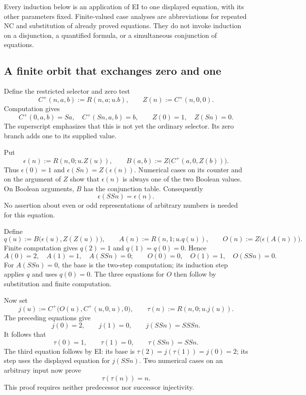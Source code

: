 Every induction below is an application of EI to one displayed
equation, with its other parameters fixed.  Finite-valued case analyses
are abbreviations for repeated NC and substitution of already proved
equations.  They do not invoke induction on a disjunction, a quantified
formula, or a simultaneous conjunction of equations.

\subsection{A finite orbit that exchanges zero and one}

Define the restricted selector and zero test
\[
 C^+(n,a,b):=R(n,a;u.b),\qquad Z(n):=C^+(n,0,0).
\]
Computation gives
\[
 C^+(0,a,b)=Sa,\quad C^+(Sn,a,b)=b,\qquad
 Z(0)=1,\quad Z(Sn)=0.
\]
The superscript emphasizes that this is not yet the ordinary selector.
Its zero branch adds one to its supplied value.

Put
\[
 \epsilon(n):=R(n,0;u.Z(u)),\qquad
 B(a,b):=Z\bigl(C^+(a,0,Z(b))\bigr).
\]
Thus $\epsilon(0)=1$ and $\epsilon(Sn)=Z(\epsilon(n))$.
Numerical cases on its counter and on the argument of $Z$ show that
$\epsilon(n)$ is always one of the two Boolean values.  On Boolean
arguments, $B$ has the conjunction table.  Consequently
\[
 \epsilon(SSn)=\epsilon(n).
 \label{ss:parity-period}
\]
No assertion about even or odd representations of arbitrary numbers is
needed for this equation.

Define
\[
 q(u):=B\bigl(\epsilon(u),Z(Z(u))\bigr),\qquad
 A(n):=R(n,1;u.q(u)),\qquad
 O(n):=Z\bigl(\epsilon(A(n))\bigr).
\]
Finite computation gives $q(2)=1$ and $q(1)=q(0)=0$.  Hence
\[
 A(0)=2,\quad A(1)=1,\quad A(SSn)=0;
 \qquad O(0)=0,\quad O(1)=1,\quad O(SSn)=0.
 \label{ss:one-indicator}
\]
For $A(SSn)=0$, the base is the two-step computation; its induction
step applies $q$ and uses $q(0)=0$.  The three equations for $O$ then
follow by substitution and finite computation.

Now set
\[
 j(u):=C^+\bigl(O(u),C^+(u,0,u),0\bigr),\qquad
 \tau(n):=R(n,0;u.j(u)).
\]
The preceding equations give
\[
 j(0)=2,\qquad j(1)=0,\qquad j(SSn)=SSSn.
\]
It follows that
\begin{equation}
 \tau(0)=1,\qquad \tau(1)=0,\qquad \tau(SSn)=SSn.
 \label{ss:swap}
\end{equation}
The third equation follows by EI: its base is
$\tau(2)=j(\tau(1))=j(0)=2$; its step uses the displayed equation
for $j(SSn)$.  Two numerical cases on an arbitrary input now prove
\begin{equation}
                         \tau(\tau(n))=n.
 \label{ss:swap-involution}
\end{equation}
This proof requires neither predecessor nor successor injectivity.

